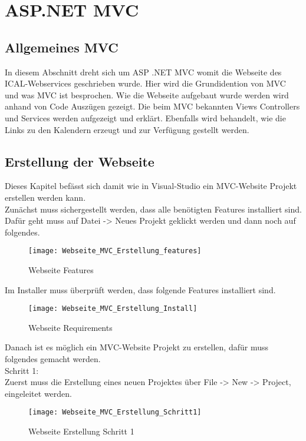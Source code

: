 {\chapter{ASP.NET MVC}
\label{sec:MVC}
\section{Allgemeines MVC}
\label{sec:allgemein}
In diesem Abschnitt dreht sich um ASP .NET MVC womit die Webseite des ICAL-Webservices geschrieben wurde. Hier wird die Grundidention von MVC und was MVC ist besprochen. Wie die Webseite aufgebaut wurde werden wird anhand von Code Auszügen gezeigt. Die beim MVC bekannten Views Controllers und Services werden aufgezeigt und erklärt. Ebenfalls wird behandelt, wie die Links zu den Kalendern erzeugt und zur Verfügung gestellt werden. 
\section{Erstellung der Webseite}
\label{sec:erstellung_ws}
Dieses Kapitel befässt sich damit wie in Visual-Studio ein MVC-Website Projekt erstellen werden kann.\\
Zunächst muss sichergestellt werden, dass alle benötigten Features installiert sind. Dafür geht muss auf Datei -\textgreater{} Neues Projekt geklickt werden und dann noch auf folgendes.\\
\begin{figure}[H]
    \texttt{[image: Webseite\_MVC\_Erstellung\_features]}
    \caption{Webseite Features}
    \label{fig:webfeatures}
\end{figure}
Im Installer muss überprüft werden, dass folgende Features installiert sind.\\
\begin{figure}[H]
    \texttt{[image: Webseite\_MVC\_Erstellung\_Install]}
    \caption{Webseite Requirements}
    \label{fig:webinstall}
\end{figure}
Danach ist es möglich ein MVC-Website Projekt zu erstellen, dafür muss folgendes gemacht werden.\\
Schritt 1:\\
Zuerst muss die Erstellung eines neuen Projektes über File -\textgreater{} New -\textgreater{} Project, eingeleitet werden.\\
\begin{figure}[H]
    \texttt{[image: Webseite\_MVC\_Erstellung\_Schritt1]}
    \caption{Webseite Erstellung Schritt 1}
    \label{fig:weberstell1}

\end{figure}}
